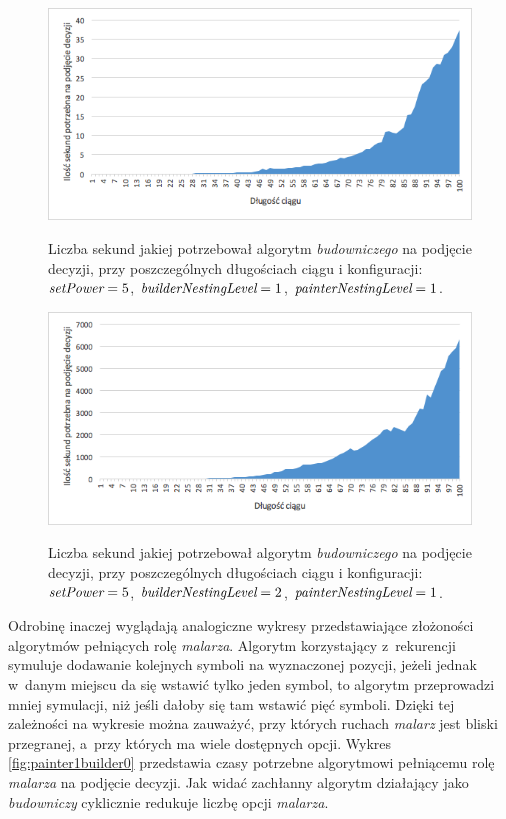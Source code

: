 \documentclass[document]{xmgr}
\begin{document}
\begin{figure}[tbh]
    \centering
    \caption{Liczba sekund jakiej potrzebował algorytm \emph{budowniczego} na podjęcie decyzji, przy poszczególnych długościach ciągu i konfiguracji: $\emph{setPower}=5$, $\emph{builderNestingLevel}=1$, $\emph{painterNestingLevel}=1$.}
    \includegraphics[width = \textwidth]{images2/timeBuilder1Painter1}
    \label{fig:builder1painter1}
\end{figure}

\begin{figure}[tbh]
    \centering
    \caption{Liczba sekund jakiej potrzebował algorytm \emph{budowniczego} na podjęcie decyzji, przy poszczególnych długościach ciągu i konfiguracji: $\emph{setPower}=5$, $\emph{builderNestingLevel}=2$, $\emph{painterNestingLevel}=1$.}
    \includegraphics[width = \textwidth]{images2/timeBuilder2Painter1}
    \label{fig:builder2painter1}
\end{figure}

Odrobinę inaczej wyglądają analogiczne wykresy przedstawiające złożoności algorytmów pełniących rolę \emph{malarza}. Algorytm korzystający z~rekurencji symuluje dodawanie kolejnych symboli na wyznaczonej pozycji, jeżeli jednak w~danym miejscu da się wstawić tylko jeden symbol, to algorytm przeprowadzi mniej symulacji, niż jeśli dałoby się tam wstawić pięć symboli. Dzięki tej zależności na wykresie można zauważyć, przy których ruchach \emph{malarz} jest bliski przegranej, a~przy których ma wiele dostępnych opcji. Wykres \ref{fig:painter1builder0} przedstawia czasy potrzebne algorytmowi pełniącemu rolę \emph{malarza} na podjęcie decyzji. Jak widać zachłanny algorytm działający jako \emph{budowniczy} cyklicznie redukuje liczbę opcji \emph{malarza}.
\end{document}
